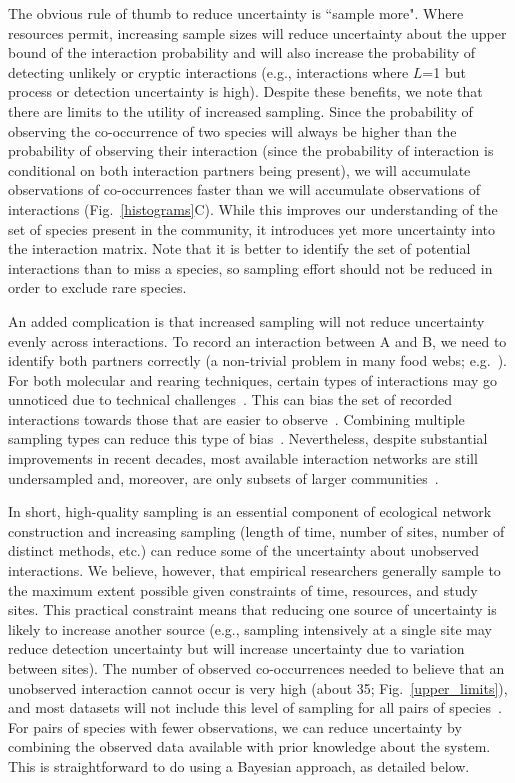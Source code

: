 \documentclass[12pt]{article}
\begin{document}
\begin{spacing}{2.0}
        The obvious rule of thumb to reduce uncertainty is ``sample more". Where resources permit, increasing sample sizes will reduce uncertainty about the upper bound of the interaction probability and will also increase the probability of detecting unlikely or cryptic interactions (e.g., interactions where $L$=1 but process or detection uncertainty is high). Despite these benefits, we note that there are limits to the utility of increased sampling. Since the probability of observing the co-occurrence of two species will always be higher than the probability of observing their interaction (since the probability of interaction is conditional on both interaction partners being present), we will accumulate observations of co-occurrences faster than we will accumulate observations of interactions (Fig.~\ref{histograms}C). While this improves our understanding of the set of species present in the community, it introduces yet more uncertainty into the interaction matrix. Note that it is better to identify the set of potential interactions than to miss a species, so sampling effort should not be reduced in order to exclude rare species.


        An added complication is that increased sampling will not reduce uncertainty evenly across interactions. To record an interaction between A and B, we need to identify both partners correctly (a non-trivial problem in many food webs; e.g.~\citealp{Kaartinen2011,Roslin2016}). For both molecular and rearing techniques, certain types of interactions may go unnoticed due to technical challenges~\citep{Wirta2014}. This can bias the set of recorded interactions towards those that are easier to observe~\citep{Carstensen2014,Jordano2016}. Combining multiple sampling types can reduce this type of bias~\citep{Wirta2014,Jordano2016}. Nevertheless, despite substantial improvements in recent decades, most available interaction networks are still undersampled and, moreover, are only subsets of larger communities~\citep{Bartomeus2013,Jordano2016}. 


        In short, high-quality sampling is an essential component of ecological network construction and increasing sampling (length of time, number of sites, number of distinct methods, etc.) can reduce some of the uncertainty about unobserved interactions. We believe, however, that empirical researchers generally sample to the maximum extent possible given constraints of time, resources, and study sites. This practical constraint means that reducing one source of uncertainty is likely to increase another source (e.g., sampling intensively at a single site may reduce detection uncertainty but will increase uncertainty due to variation between sites). The number of observed co-occurrences needed to believe that an unobserved interaction cannot occur is very high (about 35; Fig.~\ref{upper_limits}), and most datasets will not include this level of sampling for all pairs of species~\citep{Bartomeus2013}. For pairs of species with fewer observations, we can reduce uncertainty by combining the observed data available with prior knowledge about the system. This is straightforward to do using a Bayesian approach, as detailed below.



\end{spacing}
\end{document}
